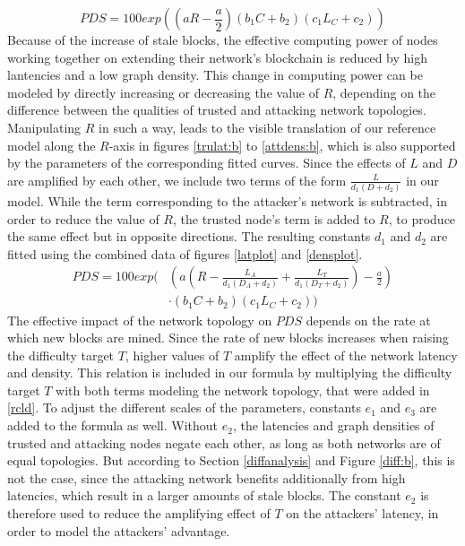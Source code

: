 \documentclass[a4paper,12pt,twoside]{report}
\begin{document}
\begin{equation}\label{rcl}
PDS = 100 exp \left( \left( a R- \frac{a}{2} \right) \left( b_1C+b_2 \right) \left( c_1L_C+c_2 \right) \right)
\end{equation}
Because of the increase of stale blocks, the effective computing power of nodes working together on extending their network's blockchain is reduced by high lantencies and a low graph density. This change in computing power can be modeled by directly increasing or decreasing the value of $R$, depending on the difference between the qualities of trusted and attacking network topologies. Manipulating $R$ in such a way, leads to the visible translation of our reference model along the $R$-axis in figures \ref{trulat:b} to \ref{attdens:b}, which is also supported by the parameters of the corresponding fitted curves.  Since the effects of $L$ and $D$ are amplified by each other, we include two terms of the form $\frac{L}{d_1(D+d_2)}$ in our model. While the term corresponding to the attacker's network is subtracted, in order to reduce the value of $R$, the trusted node's term is added to $R$, to produce the same effect but in opposite directions. The resulting constants $d_1$ and $d_2$ are fitted using the combined data of figures \ref{latplot} and \ref{densplot}.
\begin{equation}\label{rcld}
\begin{split}
PDS = 100 exp \Biggl( & \left( a \left( R-\frac{ L_A}{d_1 \left( D_A+d_2 \right)}+\frac{ L_T}{d_1 \left( D_T+d_2 \right)} \right) - \frac{a}{2} \right) \\
           & \cdot \left( b_1C+b_2 \right) \left( c_1L_C+c_2 \right) \Biggr)
\end{split}
\end{equation}
The effective impact of the network topology on $PDS$ depends on the rate at which new blocks are mined. Since the rate of new blocks increases when raising the difficulty target $T$, higher values of $T$ amplify the effect of the network latency and density. This relation is included in our formula by multiplying the difficulty target $T$ with both terms modeling the network topology, that were added in \autoref{rcld}. To adjust the different scales of the parameters, constants $e_1$ and $e_3$ are added to the formula as well. Without $e_2$, the latencies and graph densities of trusted and attacking nodes negate each other, as long as both networks are of equal topologies. But according to Section \ref{diffanalysis} and Figure \ref{diff:b}, this is not the case, since the attacking network benefits additionally from high latencies, which result in a larger amounts of stale blocks. The constant $e_2$ is therefore used to reduce the amplifying effect of $T$ on the attackers' latency, in order to model the attackers' advantage.
\end{document}
